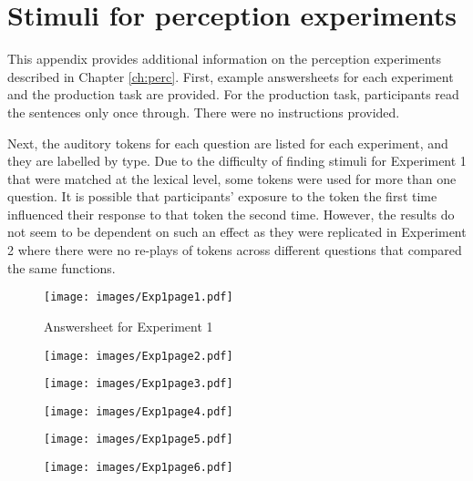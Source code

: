 \chapter{Stimuli for perception experiments}\label{appen:stimuli}

\noindent This appendix provides additional information on the perception experiments described in Chapter \ref{ch:perc}.  First, example answersheets for each experiment and the production task are provided.  For the production task, participants read the sentences only once through.  There were no instructions provided.  

Next, the auditory tokens for each question are listed for each experiment, and they are labelled by type.  Due to the difficulty of finding stimuli for Experiment 1 that were matched at the lexical level, some tokens were used for more than one question.  It is possible that participants' exposure to the token the first time influenced their response to that token the second time.  However, the results do not seem to be dependent on such an effect as they were replicated in Experiment 2 where there were no re-plays of tokens across different questions that compared the same functions.



\begin{figure}[htbp]
	\centering
		\texttt{[image: images/Exp1page1.pdf]}
		\caption{Answersheet for Experiment 1}
		\label{x1p1}
\end{figure}

\begin{figure}[htbp]
	\centering
		\texttt{[image: images/Exp1page2.pdf]}
		\label{x1p2}
\end{figure}

\begin{figure}[htbp]
	\centering
		\texttt{[image: images/Exp1page3.pdf]}
		\label{x1p3}
\end{figure}

\begin{figure}[htbp]
	\centering
		\texttt{[image: images/Exp1page4.pdf]}
		\label{x1p4}
\end{figure}

\begin{figure}[htbp]
	\centering
		\texttt{[image: images/Exp1page5.pdf]}
		\label{x1p5}
\end{figure}

\begin{figure}[htbp]
	\centering
		\texttt{[image: images/Exp1page6.pdf]}
	\label{x1p6}
\end{figure}

